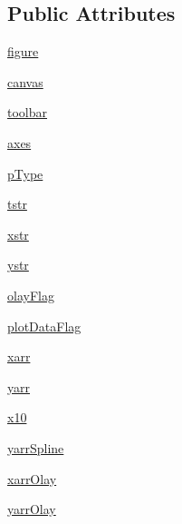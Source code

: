 \subsection*{Public Attributes}
\begin{DoxyCompactItemize}
\item 
\hyperlink{class_my_plot_widget_1_1_my_plot_widget_a3f90de6f5ac0f2f681457c7d1db66422}{figure}
\item 
\hyperlink{class_my_plot_widget_1_1_my_plot_widget_ae40a5f04a117f5863db217e6134cde3a}{canvas}
\item 
\hyperlink{class_my_plot_widget_1_1_my_plot_widget_a5c0d1b439e1708a9e105e9c1123ba19c}{toolbar}
\item 
\hyperlink{class_my_plot_widget_1_1_my_plot_widget_afdd3a63e478b90f8a9d43d813eef44f3}{axes}
\item 
\hyperlink{class_my_plot_widget_1_1_my_plot_widget_a4a63c84c067d764fcdef1e84b36331a4}{p\-Type}
\item 
\hyperlink{class_my_plot_widget_1_1_my_plot_widget_a1ca45f1c4b0bea8328ca2926126f0468}{tstr}
\item 
\hyperlink{class_my_plot_widget_1_1_my_plot_widget_a07aaae96f1d5667f6125cf6bf7274a14}{xstr}
\item 
\hyperlink{class_my_plot_widget_1_1_my_plot_widget_a1257bc7678d216ec50d9cafa6329c8a7}{ystr}
\item 
\hyperlink{class_my_plot_widget_1_1_my_plot_widget_aa95c6b8ff2b9952b5f4fdca6b5aa2901}{olay\-Flag}
\item 
\hyperlink{class_my_plot_widget_1_1_my_plot_widget_a64e693fbacbde23a8c8d08899aa6dcdd}{plot\-Data\-Flag}
\item 
\hyperlink{class_my_plot_widget_1_1_my_plot_widget_af8e35141d9588e42805da0c06bcffd32}{xarr}
\item 
\hyperlink{class_my_plot_widget_1_1_my_plot_widget_aa1b1b70359cb0139710db0982040778b}{yarr}
\item 
\hyperlink{class_my_plot_widget_1_1_my_plot_widget_ada9f240a51b2615a25fef530c4028350}{x10}
\item 
\hyperlink{class_my_plot_widget_1_1_my_plot_widget_a2bcd4bfd7b9d5c75e58140845b87508d}{yarr\-Spline}
\item 
\hyperlink{class_my_plot_widget_1_1_my_plot_widget_ad4ac85f27d3aded8658bb61a50c3f72e}{xarr\-Olay}
\item 
\hyperlink{class_my_plot_widget_1_1_my_plot_widget_a26308ed5767dd716db3984aa549fddef}{yarr\-Olay}
\end{DoxyCompactItemize}



